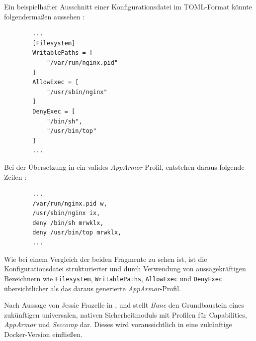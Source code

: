 \documentclass[../main.tex]{subfiles}
\begin{document}
      Ein beispielhafter Ausschnitt einer Konfigurationsdatei im \acrshort{TOML}-Format könnte folgendermaßen aussehen \cite{githubBaneTOML}:

      \begin{lstlisting}
        ...
        [Filesystem]
        WritablePaths = [
        	"/var/run/nginx.pid"
        ]
        AllowExec = [
        	"/usr/sbin/nginx"
        ]
        DenyExec = [
        	"/bin/sh",
        	"/usr/bin/top"
        ]
        ...
      \end{lstlisting}

      Bei der Übersetzung in ein valides \emph{AppArmor}-Profil, entstehen daraus folgende Zeilen \cite{githubBaneAppArmorSample}:

      \begin{lstlisting}
        ...
        /var/run/nginx.pid w,
        /usr/sbin/nginx ix,
        deny /bin/sh mrwklx,
        deny /usr/bin/top mrwklx,
        ...
      \end{lstlisting}

      Wie bei einem Vergleich der beiden Fragmente zu sehen ist, ist die Konfigurationsdatei strukturierter und durch Verwendung von aussagekräftigen Bezeichnern wie \texttt{Filesystem}, \texttt{WritablePaths}, \texttt{AllowExec} und \texttt{DenyExec} übersichtlicher als das daraus generierte \emph{AppArmor}-Profil.

      Nach Aussage von Jessie Frazelle in
      \cite{githubBane}, \cite{githubGeneralSecProfiles}
      und \cite{docker110Security} stellt \emph{Bane} den Grundbaustein eines zukünftigen universalen, nativen Sicherheitmoduls mit Profilen für Capabilities, \emph{AppArmor} und \emph{Seccomp} dar. Dieses wird voraussichtlich in eine zukünftige Docker-Version einfließen.
\end{document}
